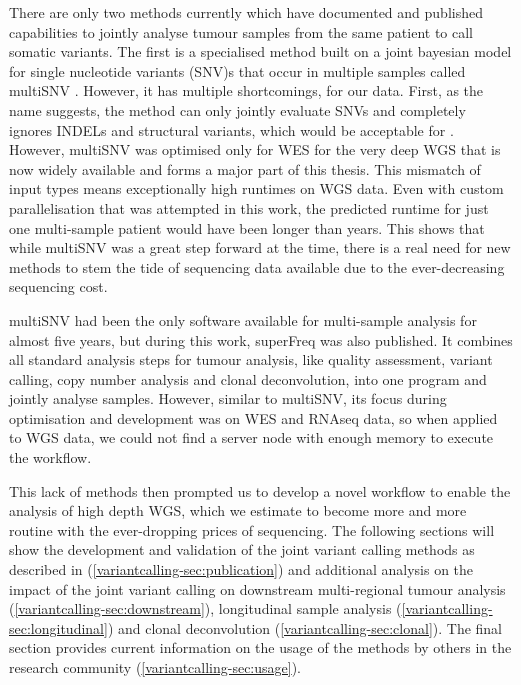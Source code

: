 There are only two methods currently which have documented and published capabilities to jointly analyse tumour samples from the same patient to call somatic variants. The first is a specialised method built on a joint bayesian model for single nucleotide variants (SNV)s that occur in multiple samples called multiSNV \cite{Josephidou2015}. However, it has multiple shortcomings,  for our data. First, as the name suggests, the method can only jointly evaluate SNVs and completely ignores INDELs and structural variants, which would be acceptable for . However, multiSNV was optimised only for WES  for the very deep WGS that is now widely available and forms a major part of this thesis. This mismatch of input types means exceptionally high runtimes on WGS data. Even with custom parallelisation that was attempted in this work, the predicted runtime for just one multi-sample patient would have been longer than  years. This  shows that while multiSNV was a great step forward at the time, there is a real need for new methods to stem the tide of sequencing data available due to the ever-decreasing sequencing cost.

multiSNV had been the only software available for multi-sample analysis for almost five years, but during this work, superFreq \cite{Flensburg2020} was also published. It combines all standard analysis steps for tumour analysis, like quality assessment, variant calling, copy number analysis and clonal deconvolution, into one program and  jointly analyse samples. However, similar to multiSNV, its focus during optimisation and development was on WES and RNAseq data, so when applied to WGS data, we could not find a server node with enough memory to execute the workflow.

This lack of methods then prompted us to develop a novel workflow to enable the analysis of high depth WGS, which we estimate to become more and more routine with the ever-dropping prices of sequencing. The following sections will show the development and validation of the joint variant calling methods as described in \textcite{Hollizeck2021} (\autoref{variantcalling-sec:publication}) and additional analysis on the impact of the joint variant calling on downstream multi-regional tumour analysis (\autoref{variantcalling-sec:downstream}), longitudinal sample analysis (\autoref{variantcalling-sec:longitudinal}) and clonal deconvolution (\autoref{variantcalling-sec:clonal}). The final section provides current information on the usage of the methods by others in the research community (\autoref{variantcalling-sec:usage}).

